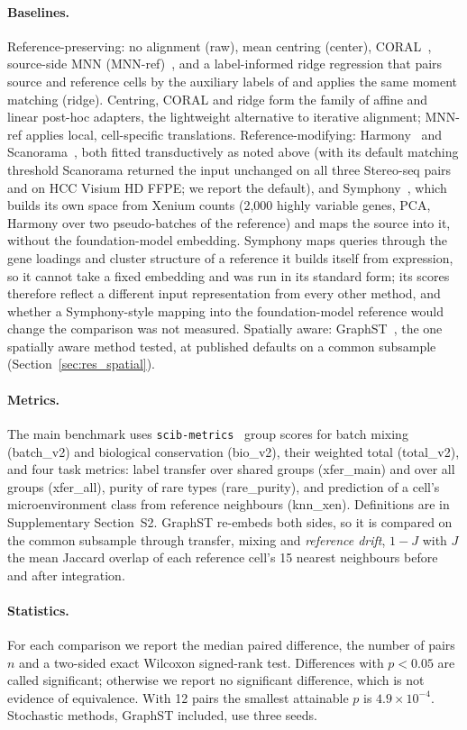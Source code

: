 \paragraph{Baselines.}\label{sec:baselines}
Reference-preserving: no alignment (raw), mean centring (center), CORAL~\citep{sun2016coral}, source-side MNN
(MNN-ref)~\citep{haghverdi2018mnn}, and a label-informed ridge regression that pairs source and reference cells by
the auxiliary labels of \frost and applies the same moment matching (ridge). Centring, CORAL and ridge form the
family of affine and linear post-hoc adapters, the lightweight alternative to iterative alignment; MNN-ref applies
local, cell-specific translations. Reference-modifying:
Harmony~\citep{korsunsky2019harmony} and Scanorama~\citep{hie2019scanorama}, both fitted transductively as noted above (with its default matching threshold Scanorama returned the input unchanged on all
three Stereo-seq pairs and on HCC Visium HD FFPE; we report the default), and Symphony~\citep{kang2021symphony}, which builds its own space from Xenium counts (2{,}000 highly variable
genes, PCA, Harmony over two pseudo-batches of the reference) and maps the source into it, without the
foundation-model embedding. Symphony maps queries through the gene loadings and cluster structure of a reference it
builds itself from expression, so it cannot take a fixed embedding and was run in its standard form; its scores
therefore reflect a different input representation from every other method, and whether a Symphony-style mapping
into the foundation-model reference would change the comparison was not measured.
Spatially aware: GraphST~\citep{long2023graphst}, the one spatially aware method tested, at published
defaults on a common subsample (Section~\ref{sec:res_spatial}).

\paragraph{Metrics.}\label{sec:metrics}
The main benchmark uses \texttt{scib-metrics}~\citep{luecken2022scib} group scores for batch mixing (batch\_v2) and
biological conservation (bio\_v2), their weighted total (total\_v2), and four task metrics: label transfer over
shared groups (xfer\_main) and over all groups (xfer\_all), purity of rare types (rare\_purity), and prediction of a
cell's microenvironment class from reference neighbours (knn\_xen). Definitions are in Supplementary
Section~S2. GraphST re-embeds both sides, so it is compared on the common subsample through
transfer, mixing and \emph{reference drift}, $1-J$ with $J$ the mean Jaccard overlap of each reference cell's 15
nearest neighbours before and after integration.

\paragraph{Statistics.}\label{sec:stats}
For each comparison we report the median paired difference, the number of pairs $n$ and a two-sided exact Wilcoxon
signed-rank test. Differences with $p<0.05$ are called significant; otherwise we report no significant difference,
which is not evidence of equivalence. With 12 pairs the smallest attainable $p$ is $4.9\times10^{-4}$. Stochastic methods, GraphST included, use three seeds.
